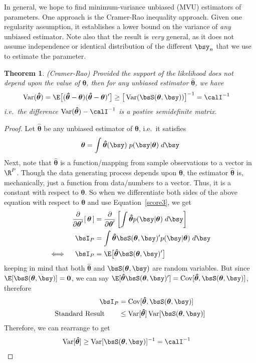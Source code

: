 \documentclass[12pt]{article}
\theoremstyle{plain}
\newtheorem{thm}{Theorem}[section]
\theoremstyle{definition}
\theoremstyle{remark}
\newcommand{\bstheta}{\boldsymbol{\theta}}
\newcommand{\bshattheta}{\boldsymbol{\hat{\theta}}}
\renewcommand{\bso}{\boldsymbol{0}}
\newcommand{\Cov}{\operatorname{Cov}}
\newcommand{\Var}{\operatorname{Var}}
\begin{document}
In general, we hope to find minimum-variance unbiased (MVU) estimators
of parameters. One approach is the Cramer-Rao inequality approach.
Given one regularity assumption, it establishes a lower bound on the
variance of \emph{any} unbiased estimator.
Note also that the result is \emph{very} general, as it does not assume
independence or identical distribution of the different $\bsy_n$ that we
use to estimate the parameter.

\begin{thm}\emph{(Cramer-Rao)}
Provided the support of the likelihood does \emph{not} depend upon the
value of $\bstheta$, then for \emph{any} unbiased estimator
$\bshattheta$, we have
\begin{align*}
  \Var(\bshattheta)
  =
  \E\big[ (\bshattheta-\bstheta) (\bshattheta-\bstheta)' \big]
  &\geq
  \big[\Var(\bsS(\bstheta,\bsy))\big]^{-1}
  =
  \calI^{-1}
\end{align*}
i.e.\ the difference $\Var(\bshattheta)-\calI^{-1}$ is a postive
semidefinite matrix.
\end{thm}
\begin{proof}
Let $\bshattheta$ be any unbiased estimator of $\bstheta$, i.e.\ it
satisfies
\begin{align*}
  \bstheta = \int \bshattheta(\bsy) \; p(\bsy|\bstheta) \; d\bsy
\end{align*}
Next, note that $\bshattheta$ is a function/mapping from sample
observations to a vector in $\R^P$. Though the data generating process
depends upon $\bstheta$, the estimator $\bshattheta$ is, mechanically,
just a function from data/numbers to a vector. Thus, it is a constant
with respect to $\bstheta$. So when we differentiate both sides of the
above equation with respect to $\bstheta$ and use Equation~\ref{score3},
we get
\begin{align*}
  \frac{\partial}{\partial\bstheta'}
  [\,
  \bstheta
  \,]
  &=
  \frac{\partial}{\partial\bstheta'}
  \left[
  \int \bshattheta p(\bsy|\bstheta) \; d\bsy
  \right]
  \\
  \bsI_P
  &= \int \bshattheta \bsS(\bstheta,\bsy)' p(\bsy|\bstheta)\; d\bsy \\
  \iff\quad
  \bsI_P
  &= \E\big[\bshattheta \bsS(\bstheta,\bsy)'\big]
\end{align*}
keeping in mind that both $\bshattheta$ and $\bsS(\bstheta,\bsy)$ are
random variables. But since $\E[\bsS(\bstheta,\bsy)]=\bso$, we can say
$\E[\bshattheta \bsS(\bstheta,\bsy)'] =
\Cov[\bshattheta,\bsS(\bstheta,\bsy)]$, therefore
\begin{align*}
  \bsI_P &=
  \Cov[\bshattheta,\bsS(\bstheta,\bsy)]
  \\
  \text{Standard Result} \qquad
  &\leq
  \Var[\bshattheta]\Var[\bsS(\bstheta,\bsy)]
\end{align*}
Therefore, we can rearrange to get
\begin{align*}
  \Var[\bshattheta]
  &\geq
  \Var[\bsS(\bstheta,\bsy)]^{-1}
  =\calI^{-1}
\end{align*}
\end{proof}
\end{document}
